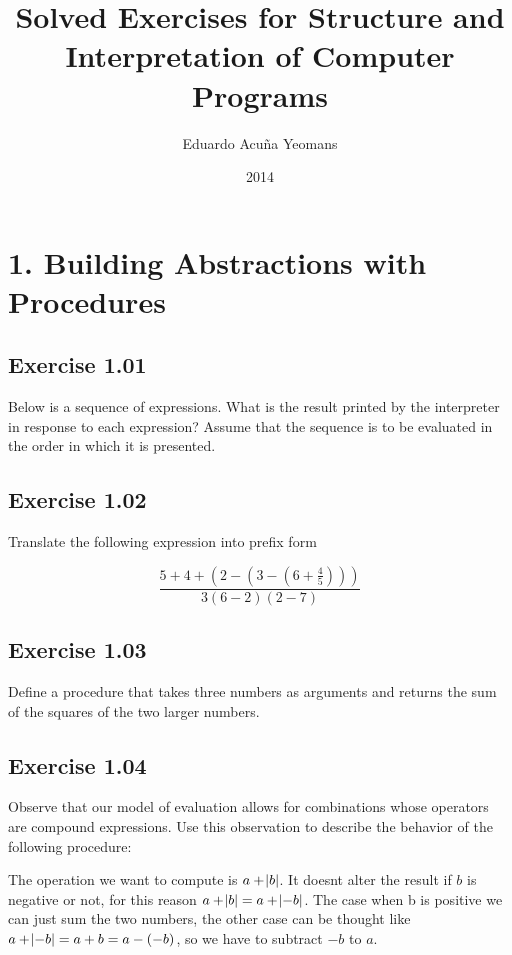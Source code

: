 \documentclass[letterpaper, leqno]{article}
\title{Solved Exercises for Structure and Interpretation of Computer Programs}
\author{Eduardo Acuña Yeomans}
\date{2014}
\begin{document}
\maketitle

\section*{1. Building Abstractions with Procedures}

\subsection*{Exercise 1.01}
Below is a sequence of expressions. What is the result printed by the interpreter in response to each expression? Assume that the sequence is to be evaluated in the order in which it is presented.



\subsection*{Exercise 1.02}
Translate the following expression into prefix form

$$\frac{5+4+(2-(3-(6+ \frac{4}{5} )))}{3(6-2)(2-7)}$$



\subsection*{Exercise 1.03}
Define a procedure that takes three numbers as arguments and returns the sum of the squares of the two larger numbers.



\subsection*{Exercise 1.04}
Observe that our model of evaluation allows for combinations whose operators are compound expressions. Use this observation to describe the behavior of the following procedure:




\textcolor{answer}
{
  The operation we want to compute is $a + \abs{b}$. It doesnt alter the result if $b$ is negative or not, for this reason $a + \abs{b} = a + \abs{-b}$. The case when b is positive we can just sum the two numbers, the other case can be thought like $a + \abs{-b} = a + b = a - (-b)$, so we have to subtract $-b$ to $a$.
}
\end{document}
